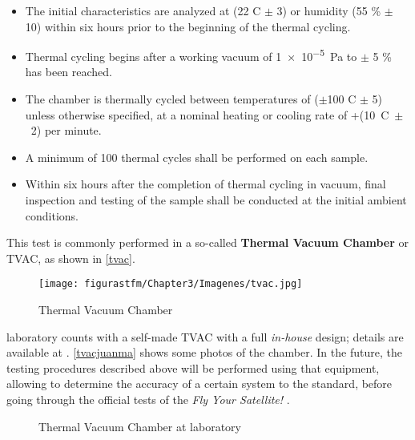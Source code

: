 \begin{itemize} [noitemsep,topsep=0pt]
	

	\item{The initial characteristics are analyzed at (22 \textdegree C	$\pm$ 3) or humidity (55 \%	$\pm$ 10) within six hours prior to the beginning of the thermal cycling.} \\
	\item{Thermal cycling begins after a working vacuum of \SI{1e-5}{\pascal} to $\pm$ 5 \% has been reached.} \\
	\item{The chamber is thermally cycled between temperatures of ($\pm$100 \textdegree C $\pm$ 5) unless otherwise specified, at a nominal heating or cooling rate of +(10~\textdegree C~$\pm$~2) per minute.} \\
	\item{A minimum of 100 thermal cycles shall be performed on each sample.} \\
	\item{Within six hours after the completion of thermal cycling in vacuum, final inspection and testing of the sample shall be conducted at the initial ambient conditions.} \\

\end{itemize}

This test is commonly performed in a so-called \textbf{Thermal Vacuum Chamber} or \acrshort{TVAC}, as shown in \autoref{tvac}. 

\vspace{1cm}
	\begin{figure} [H] 				
				\centering
				\texttt{[image: figurastfm/Chapter3/Imagenes/tvac.jpg]}
				\caption{Thermal Vacuum Chamber \cite{isispace}} \label{tvac}
			\end{figure}

\newpage
{} laboratory counts with a self-made \acrshort{TVAC} with a full \textit{in-house} design; details are available at \cite{juanma}. \autoref{tvacjuanma} shows some photos of the chamber. In the future, the testing procedures described above will be performed using that equipment, allowing to determine the accuracy of a certain system to the standard, before going through the official tests of the \textit{Fly Your Satellite!} \cite{flyyour}.

			\begin{figure}[H]
			\centering
			 \quad
			\caption{Thermal Vacuum Chamber at  laboratory} \label{tvacjuanma}
\end{figure}


